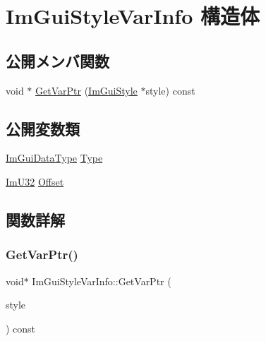 \hypertarget{struct_im_gui_style_var_info}{}\section{Im\+Gui\+Style\+Var\+Info 構造体}
\label{struct_im_gui_style_var_info}
\subsection*{公開メンバ関数}
\begin{DoxyCompactItemize}
\item 
void $\ast$ \mbox{\hyperlink{struct_im_gui_style_var_info_a92aebc5f0d8b2b43b61dbcaf992b5643}{Get\+Var\+Ptr}} (\mbox{\hyperlink{struct_im_gui_style}{Im\+Gui\+Style}} $\ast$style) const
\end{DoxyCompactItemize}
\subsection*{公開変数類}
\begin{DoxyCompactItemize}
\item 
\mbox{\hyperlink{imgui__internal_8h_a22f27475affc8d8a1f2407887e5e1d19}{Im\+Gui\+Data\+Type}} \mbox{\hyperlink{struct_im_gui_style_var_info_a62f42d2bb7b71b7530493e16e622cb81}{Type}}
\item 
\mbox{\hyperlink{imgui_8h_a118cff4eeb8d00e7d07ce3d6460eed36}{Im\+U32}} \mbox{\hyperlink{struct_im_gui_style_var_info_ae900d6a02166d3d0433c18b95aec10e8}{Offset}}
\end{DoxyCompactItemize}


\subsection{関数詳解}
\mbox{\label{struct_im_gui_style_var_info_a92aebc5f0d8b2b43b61dbcaf992b5643}} 
\subsubsection{\texorpdfstring{Get\+Var\+Ptr()}{GetVarPtr()}}
{\footnotesize\ttfamily void$\ast$ Im\+Gui\+Style\+Var\+Info\+::\+Get\+Var\+Ptr (\begin{DoxyParamCaption}\item[{\mbox{\hyperlink{struct_im_gui_style}{Im\+Gui\+Style}} $\ast$}]{style }\end{DoxyParamCaption}) const\hspace{0.3cm}{\ttfamily [inline]}}



